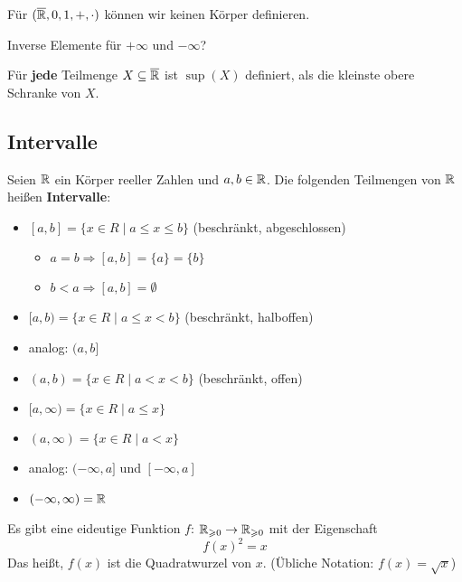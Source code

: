 \documentclass[main.tex]{subfiles}
\begin{document}
\begin{Theorem}
  Für $(\overline{\mathbb{R}},0,1,+,\cdot)$ können wir keinen Körper definieren.
\end{Theorem}

\begin{Beweis}
  Inverse Elemente für $+\infty$ und $-\infty$?
\end{Beweis}

\begin{Theorem}
  Für \textbf{jede} Teilmenge $X \subseteq \overline{\mathbb{R}}$ ist $\sup(X)$ definiert, als die kleinste obere Schranke von $X$.
\end{Theorem}

\subsection{Intervalle}

\begin{Definition}[Intervalle]
  Seien $\mathbb{R}$ ein Körper reeller Zahlen und $a,b\in \mathbb{R}$. Die folgenden Teilmengen von $\mathbb{R}$ heißen \textbf{Intervalle}:
  \begin{itemize}
    \item $[a,b] = \{x \in R \mid a \leq x \leq b \}$ (beschränkt, abgeschlossen)
    \begin{Bemerkung}
      \begin{itemize}
        \item $a = b \Rightarrow [a,b] = \{a\} =\{b\}$
        \item $b < a \Rightarrow [a,b] = \emptyset$
      \end{itemize}
    \end{Bemerkung}
    \item $[a,b) = \{x \in R \mid a \leq x < b \}$ (beschränkt, halboffen)
    \item analog: $(a,b]$
    \item $(a,b) = \{x \in R \mid a < x < b \}$ (beschränkt, offen)
    \item $[a, \infty) = \{x \in R \mid a \leq x \}$
    \item $(a, \infty) = \{x \in R \mid a < x \}$
    \item analog: $(-\infty, a]$ und $[-\infty, a]$
    \item $(-\infty, \infty) = \mathbb{R}$
  \end{itemize}
\end{Definition}

Es gibt eine eideutige Funktion $f$: $\mathbb{R}_{\geqslant 0} \to \mathbb{R}_{\geqslant 0}$ mit der Eigenschaft
$$f(x)^2 = x$$
Das heißt, $f(x)$ ist die Quadratwurzel von $x$. (Übliche Notation: $f(x) = \sqrt{x}$)
\end{document}
